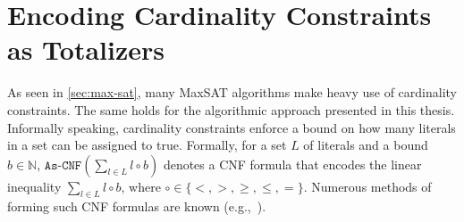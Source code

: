 \section{Encoding Cardinality Constraints as Totalizers\label{sec:card-const}}


As seen in \cref{sec:max-sat}, many MaxSAT algorithms make heavy use of cardinality constraints.
The same holds for the algorithmic approach presented in this thesis.
Informally speaking, cardinality constraints enforce a bound on how many literals in a set can be assigned to true.
Formally, for a set $L$ of literals and a bound $b \in \mathbb{N}$, $\texttt{As-CNF}\left(\sum_{l \in L} l \circ b\right)$ denotes a CNF formula that encodes the linear inequality $\sum_{l \in L} l \circ b$, where $\circ \in \{< ,> ,\geq, \leq, =\}$.
Numerous methods of forming such CNF formulas are known (e.g.,~\autocites{DBLP:conf/cp/BailleuxB03,DBLP:conf/cp/Sinz05,DBLP:journals/jsat/EenS06}).

